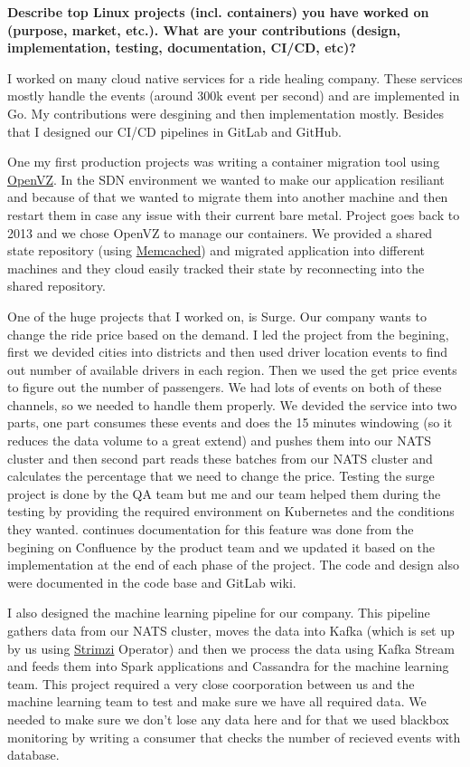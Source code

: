\noindent
\textbf{Describe top Linux projects (incl. containers) you have worked on (purpose, market, etc.).
What are your contributions (design, implementation, testing, documentation, CI/CD, etc)?}

I worked on many cloud native services for a ride healing company. These services mostly handle the events (around
300k event per second) and are implemented in Go. My contributions were desgining and then implementation mostly.
Besides that I designed our CI/CD pipelines in GitLab and GitHub.

One my first production projects was writing a container migration tool using \href{https://openvz.org/}{OpenVZ}.
In the SDN environment we wanted to make our application resiliant and because of that we wanted to migrate them into
another machine and then restart them in case any issue with their current bare metal.
Project goes back to 2013 and we chose OpenVZ to manage our containers. We provided a shared state repository (using \href{https://memcached.org/}{Memcached})
and migrated application into different machines and they cloud easily tracked their state by reconnecting into the shared
repository.

One of the huge projects that I worked on, is Surge. Our company wants to change the ride price based on the demand.
I led the project from the begining, first we devided cities into districts and then used driver location events to find
out number of available drivers in each region. Then we used the get price events to figure out the number of passengers.
We had lots of events on both of these channels, so we needed to handle them properly. We devided the service into two parts,
one part consumes these events and does the 15 minutes windowing (so it reduces the data volume to a great extend) and
pushes them into our NATS cluster and then second part reads these batches from our NATS cluster and calculates
the percentage that we need to change the price.
Testing the surge project is done by the QA team but me and our team helped them during the testing by providing
the required environment on Kubernetes and the conditions they wanted.
continues documentation for this feature was done from the begining on Confluence by the product team and we updated it
based on the implementation at the end of each phase of the project.
The code and design also were documented in the code base and GitLab wiki.

I also designed the machine learning pipeline for our company. This pipeline gathers data from our NATS cluster,
moves the data into Kafka (which is set up by us using \href{https://strimzi.io/}{Strimzi} Operator)
and then we process the data using Kafka Stream and feeds them into Spark applications and Cassandra for the machine learning
team. This project required a very close coorporation between us and the machine learning team to test and make
sure we have all required data. We needed to make sure we don't lose any data here and for that we used blackbox monitoring
by writing a consumer that checks the number of recieved events with database.

